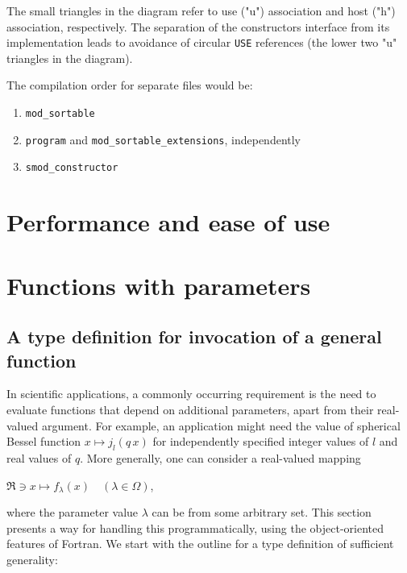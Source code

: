 \documentclass[]{scrartcl}
\providecommand{\tightlist}{%
  \setlength{\itemsep}{0pt}\setlength{\parskip}{0pt}}
\begin{document}
The small triangles in the diagram refer to use ("u") association and
host ("h") association, respectively. The separation of the
constructor\textquotesingle s interface from its implementation leads to
avoidance of circular \texttt{USE} references (the lower two "u"
triangles in the diagram).

The compilation order for separate files would be:

\begin{enumerate}
\def\labelenumi{\arabic{enumi}.}
\tightlist
\item
  \texttt{mod\_sortable}
\item
  \texttt{program} and \texttt{mod\_sortable\_extensions}, independently
\item
  \texttt{smod\_constructor}
\end{enumerate}

\section{Performance and ease of use}\label{performance-and-ease-of-use}

\section{Functions with parameters}\label{functions-with-parameters}

\subsection{A type definition for invocation of a general
function}\label{a-type-definition-for-invocation-of-a-general-function}

In scientific applications, a commonly occurring requirement is the need
to evaluate functions that depend on additional parameters, apart from
their real-valued argument. For example, an application might need the
value of spherical Bessel function \(x \mapsto j_l(q \, x)\) for
independently specified integer values of \(l\) and real values of
\(q\). More generally, one can consider a real-valued mapping

\(\Re \ni x \mapsto f_\lambda(x) \quad (\lambda \in \Omega)\),

where the parameter value \(\lambda\) can be from some arbitrary set.
This section presents a way for handling this programmatically, using
the object-oriented features of Fortran. We start with the outline for a
type definition of sufficient generality:
\end{document}
